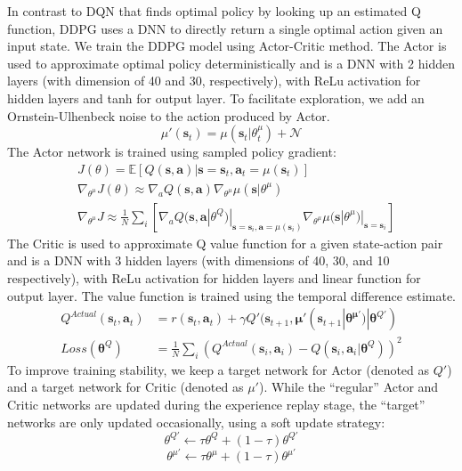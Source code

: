 \documentclass{article}
\begin{document}
In contrast to DQN that finds optimal policy by looking up an estimated Q function, DDPG uses a DNN to directly return a single optimal action given an input state. We train the DDPG model using Actor-Critic method. The Actor is used to approximate optimal policy deterministically and is a DNN with 2 hidden layers (with dimension of 40 and 30, respectively), with ReLu activation for hidden layers and tanh for output layer. To facilitate exploration, we add an Ornstein-Ulhenbeck noise to the action produced by Actor.
$$\mu'(\mathbf{s}_t) = \mu( \mathbf{s}_t | \theta^\mu_t) + \mathcal{N}$$
The Actor network is trained using sampled policy gradient:
\begin{align*}
& J(\theta) = \mathbb{E} [Q (\mathbf{s},\mathbf{a}) | \mathbf{s}=\mathbf{s}_t, \mathbf{a}_t=\mu(\mathbf{s}_t)] \\
& \nabla_{\theta^\mu}J(\theta) \approx \nabla_a Q(\mathbf{s},\mathbf{a}) \nabla_{\theta^\mu} \mu(\mathbf{s}|\theta^\mu) \\
& \nabla_{\theta^\mu}J \approx \frac{1}{N} \sum_{i} [ \nabla_a Q(\mathbf{s},\mathbf{a} | \theta^Q) |_{\mathbf{s}=\mathbf{s}_i, \mathbf{a}=\mu(\mathbf{s}_i)} \nabla_{\theta^\mu} \mu(\mathbf{s} | \theta^\mu)|_{\mathbf{s}=\mathbf{s}_i} ]
\end{align*}
The Critic is used to approximate Q value function for a given state-action pair and is a DNN with 3 hidden layers (with dimensions of 40, 30, and 10 respectively), with ReLu activation for hidden layers and linear function for output layer. The value function is trained using the temporal difference estimate.
\begin{align*}
Q^{Actual} ( \mathbf{s}_t, \mathbf{a}_t ) & = r ( \mathbf{s}_t, \mathbf{a}_t ) + \gamma Q' ( \mathbf{s}_{t+1}, \mathbf{\mu}' ( \mathbf{s}_{t+1} | \mathbf{\theta}^{\mathbf{\mu'}} ) | \mathbf{\theta}^{Q'}  )\\
Loss(\mathbf{\theta}^Q ) & = \frac{1}{N} \sum_{i} ( Q^{Actual} ( \mathbf{s}_i, \mathbf{a}_i ) - Q ( \mathbf{s}_i, \mathbf{a}_i | \mathbf{\theta}^{Q} ) )^2
\end{align*}
To improve training stability, we keep a target network for Actor (denoted as $Q'$) and a target network for Critic (denoted as $\mu'$). While the “regular” Actor and Critic networks are updated during the experience replay stage, the “target” networks are only updated occasionally, using a soft update strategy:
$$\theta^{Q'} \leftarrow \tau\theta^Q + (1-\tau)\theta^{Q'} $$
$$\theta^{\mu'} \leftarrow \tau\theta^\mu + (1-\tau)\theta^{\mu'} $$
\end{document}
